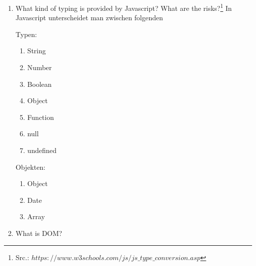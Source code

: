 \documentclass[11pt]{article}
\begin{document}
\begin{enumerate}[\thesection .1]
        \item What kind of typing is provided by Javascript? What are the risks?\footnote[2]{Src.: $https://www.w3schools.com/js/js\_type\_conversion.asp$}
        In Javascript unterscheidet man zwischen folgenden
        \begin{addmargin}[1em]{1em}
            Typen:
            \begin{enumerate}[$\circ$]
                \item String
                \item Number
                \item Boolean
                \item Object
                \item Function
                \item null
                \item undefined
            \end{enumerate}

            Objekten:
            \begin{enumerate}[$\circ$]
                \item Object
                \item Date
                \item Array
            \end{enumerate}





        \end{addmargin}



        \item What is DOM?

    \end{enumerate}
\end{document}

